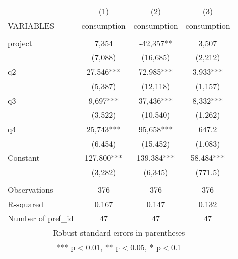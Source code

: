 \documentclass[]{article}
\begin{document}
\begin{tabular}{lccc} \hline
 & (1) & (2) & (3) \\
VARIABLES & consumption & consumption & consumption \\ \hline
 &  &  &  \\
project & 7,354 & -42,357** & 3,507 \\
 & (7,088) & (16,685) & (2,212) \\
q2 & 27,546*** & 72,985*** & 3,933*** \\
 & (5,387) & (12,118) & (1,157) \\
q3 & 9,697*** & 37,436*** & 8,332*** \\
 & (3,522) & (10,540) & (1,262) \\
q4 & 25,743*** & 95,658*** & 647.2 \\
 & (6,454) & (15,452) & (1,083) \\
Constant & 127,800*** & 139,384*** & 58,484*** \\
 & (3,282) & (6,345) & (771.5) \\
 &  &  &  \\
Observations & 376 & 376 & 376 \\
R-squared & 0.167 & 0.147 & 0.132 \\
 Number of pref\_id & 47 & 47 & 47 \\ \hline
\multicolumn{4}{c}{ Robust standard errors in parentheses} \\
\multicolumn{4}{c}{ *** p$<$0.01, ** p$<$0.05, * p$<$0.1} \\
\end{tabular}
\end{document}
